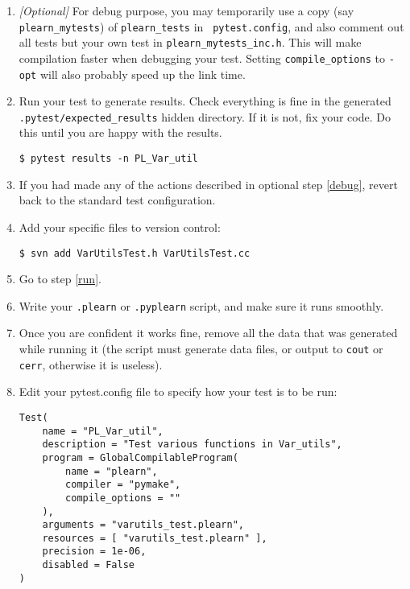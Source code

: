 \documentclass[11pt]{book}
\begin{document}
\begin{enumerate}
  \item \label{debug} {\em [Optional]} For debug purpose, you may temporarily use a
  copy (say {\tt plearn\_mytests}) of {\tt plearn\_tests} in {\tt
  pytest.config}, and also comment out all tests but your own test in
  {\tt plearn\_mytests\_inc.h}. This will make compilation faster when
  debugging your test. Setting {\tt compile\_options} to {\tt -opt} will
  also probably speed up the link time.

  \item Run your test to generate results. Check everything is fine in
  the generated {\tt .pytest/expected\_results} hidden directory. If it
  is not, fix your code. Do this until you are happy with the results.
\begin{verbatim}
$ pytest results -n PL_Var_util
\end{verbatim}

  \item If you had made any of the actions described in optional step
  \ref{debug}, revert back to the standard test configuration.

  \item Add your specific files to version control:
\begin{verbatim}
$ svn add VarUtilsTest.h VarUtilsTest.cc
\end{verbatim}

  \item Go to step \ref{run}.

  \item \label{small_test} Write your {\tt .plearn} or {\tt .pyplearn}
  script, and make sure it runs smoothly.

  \item Once you are confident it works fine, remove all the data that
  was generated while running it (the script must generate data files,
  or output to {\tt cout} or {\tt cerr}, otherwise it is useless).

  \item Edit your {pytest.config} file to specify how your test is to be
  run:
\begin{verbatim}
Test(
    name = "PL_Var_util",
    description = "Test various functions in Var_utils",
    program = GlobalCompilableProgram(
        name = "plearn",
        compiler = "pymake",
        compile_options = ""
    ),
    arguments = "varutils_test.plearn",
    resources = [ "varutils_test.plearn" ],
    precision = 1e-06,
    disabled = False
)
\end{verbatim}


\end{enumerate}
\end{document}
